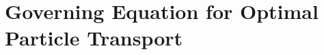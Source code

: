 \documentclass{article}
\begin{document}
%

\section{Governing Equation for Optimal Particle Transport} \label{app:optimal_flow_governing_eq}
\end{document}
